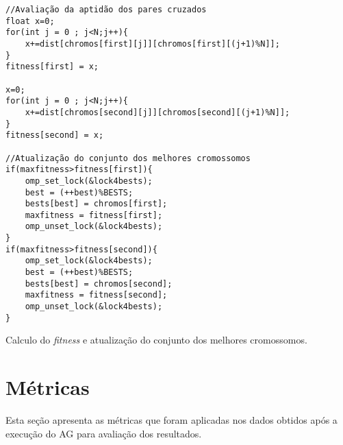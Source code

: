 \begin{codigo}[!htb]
	\begin{Verbatim}
//Avaliação da aptidão dos pares cruzados
float x=0;							
for(int j = 0 ; j<N;j++){
	x+=dist[chromos[first][j]][chromos[first][(j+1)%N]];
}
fitness[first] = x;
			
x=0;
for(int j = 0 ; j<N;j++){
	x+=dist[chromos[second][j]][chromos[second][(j+1)%N]];
}
fitness[second] = x;

//Atualização do conjunto dos melhores cromossomos			
if(maxfitness>fitness[first]){
	omp_set_lock(&lock4bests);
	best = (++best)%BESTS;
	bests[best] = chromos[first];
	maxfitness = fitness[first];
	omp_unset_lock(&lock4bests);
}
if(maxfitness>fitness[second]){
	omp_set_lock(&lock4bests);
	best = (++best)%BESTS;
	bests[best] = chromos[second];
	maxfitness = fitness[second];
	omp_unset_lock(&lock4bests);
}	
	\end{Verbatim}
	\caption{Calculo do \textit{fitness} e atualização do conjunto dos melhores cromossomos.} \label{codigo:avalizao}
\end{codigo}


\section{Métricas}
\label{secao:metricas}

Esta seção apresenta as métricas que foram aplicadas nos dados obtidos após a execução do AG para avaliação dos resultados.

